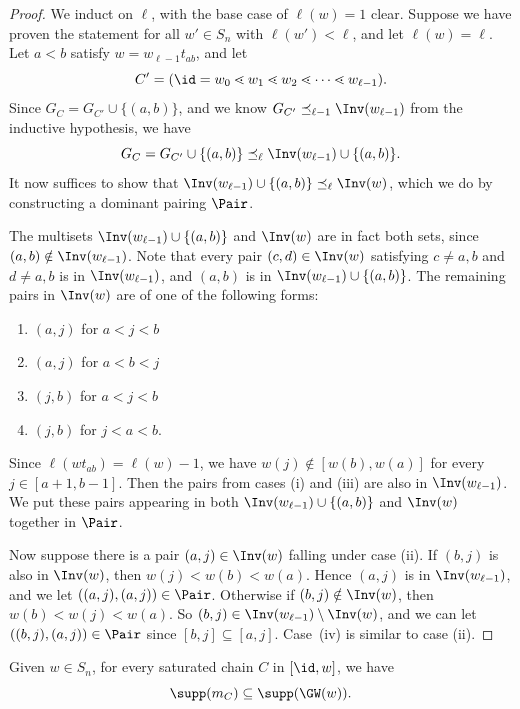 \begin{proof}
    We induct on $\ell$, with the base case of $\ell(w) = 1$ clear. Suppose we have proven the statement for all $w'\in S_n$ with $\ell(w') < \ell$, and let $\ell(w) = \ell$. Let $a < b$ satisfy $w=w_{\ell-1}t_{ab}$, and let 
    \[C'=(\id=w_0\lessdot w_1\lessdot w_2\lessdot \dots \lessdot w_{\ell-1}).\] 
    Since $G_C=G_{C'}\cup\{(a,b)\}$, and we know $G_{C'}\preceq_{\ell-1} \Inv(w_{\ell-1})$ from the inductive hypothesis, we have
    \[G_C=G_{C'}\cup\{(a,b)\}\preceq_{\ell}\Inv(w_{\ell-1})\cup\{(a,b)\}.\]
    It now suffices to show that $\Inv(w_{\ell-1})\cup\{(a,b)\}\preceq_{\ell} \Inv(w)$, which we do by constructing a dominant pairing $\Pair$.
     
    The multisets $\Inv(w_{\ell-1})\cup\{(a,b)\}$ and $\Inv(w)$ are in fact both sets, since $(a,b)\notin \Inv(w_{\ell-1})$.
    Note that every pair $(c, d)\in \Inv(w)$ satisfying $c\neq a, b$ and $d\neq a, b$ is in $\Inv(w_{\ell-1})$, and $(a,b)$ is in $\Inv(w_{\ell-1})\cup\{(a,b)\}$. The remaining pairs in $\Inv(w)$ are of one of the following forms:
    \begin{enumerate}[label=\textnormal{(\roman*)}]
        \item $(a,j)$ for $a<j<b$
        \item $(a,j)$ for $a<b<j$
        \item $(j,b)$ for $a<j<b$
        \item $(j,b)$ for $j<a<b$.
    \end{enumerate}

    Since $\ell(wt_{ab})=\ell(w)-1$, we have $w(j)\notin [w(b),w(a)]$ for every $j\in [a+1,b-1]$. Then the pairs from cases (i) and (iii) are also in $\Inv(w_{\ell-1})$.
    We put these pairs appearing in both $\Inv(w_{\ell-1})\cup\{(a,b)\}$ and $\Inv(w)$ together in $\Pair$. 

    Now suppose there is a pair $(a, j)\in\Inv(w)$ falling under case (ii). If $(b,j)$ is also in $\Inv(w)$, then $w(j) < w(b) < w(a)$. Hence $(a,j)$ is in $\Inv(w_{\ell-1})$, and we let $((a,j),(a,j))\in \Pair$. Otherwise if $(b,j)\notin \Inv(w)$, then $w(b) < w(j) < w(a)$. So $(b, j)\in \Inv(w_{\ell-1})\setminus \Inv(w)$, and we can let $((b,j),(a,j))\in \Pair$ since $[b,j]\subseteq[a,j]$. Case~(iv) is similar to case (ii).
\end{proof}

\begin{lemma}\label{lemma:chainNPcontainment}
    Given $w\in S_n$, for every saturated chain $C$ in $[\id, w]$, we have
    \[\supp(m_C)\subseteq \supp(\GW(w)).\]
\end{lemma}

